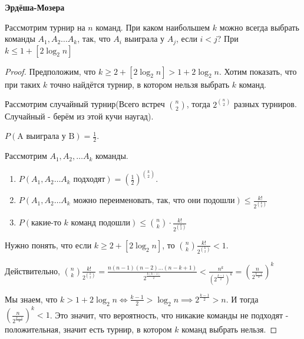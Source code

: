 \begin{theorem}
    \textbf{Эрдёша-Мозера}

    Рассмотрим турнир на $n$ команд. При каком наибольшем $k$ можно
    всегда выбрать команды $A_1, A_2 \ldots A_k$, так, что $A_i$
    выиграла у $A_j$, если $i < j$? При $k \leqslant 1 +  [2 \log_2 n] $
\end{theorem}

\begin{proof}
    Предположим, что $k \geqslant 2 + [2 \log_2 n] > 1 + 2 \log_2 n$. Хотим показать, что 
    при таких $k$ точно найдётся турнир, в котором нельзя выбрать $k$ команд.

    Рассмотрим случайный турнир(Всего встреч $\binom{n}{2}$, тогда
    $2^{\binom{n}{2}}$ разных турниров. Случайный - берём из этой
    кучи наугад).
    
    $P(\text{A выиграла у B}) = \frac{1}{2}$. 
    
    Рассмотрим $A_1, A_2, \ldots A_k$ команды.
    
    \begin{enumerate}
        \item {
            $P(A_1, A_2 \ldots A_k  \text{ подходят}) = (\frac{1}{2})^{\binom{k}{2}}$.
        }
        \item {
            $P(A_1, A_2 \ldots A_k \text{ можно переименовать, так, что они подошли}) \leqslant \frac{k!}{2^{\binom{k}{2}}}$
        }
        \item {
            $P(\text{какие-то $k$ команд подошли}) \leqslant \binom{n}{k} \cdot \frac{k!}{2^{\binom{k}{2}}}$
        }
    \end{enumerate}
    
    Нужно понять, что если $k \geqslant 2 + [2\log_2 n]$, то $\binom{n}{k} \frac{k!}{2^{\binom{k}{2}}} < 1$.

    Действительно, $\binom{n}{k} \frac{k!}{2^{\binom{k}{2}}} = \frac{n(n - 1)(n - 2) \ldots (n - k + 1)}{2^{\frac{k(k - 1)}{2}}} < \frac{n^k}{(2^{\frac{k - 1}{2}})^k} =
    \left( \frac{n}{2^{\frac{k - 1}{2}}}\right)^k$

    Мы знаем, что $k > 1 + 2 \log_2 n \Leftrightarrow \frac{k - 1}{2} > \log_2 n \implies 2^{\frac{k - 1}{2}} > n$. И тогда $\left( \frac{n}{2^{\frac{k - 1}{2}}}\right)^k < 1$. 
    Это значит, что вероятность, что никакие команды не подходят - положительная, значит есть турнир, в котором $k$ команд выбрать нельзя.
\end{proof}


